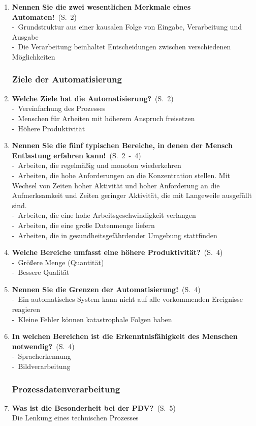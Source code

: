 \documentclass[a4paper,12pt]{article}
\newcommand{\question}[3]{\pagebreak[3]\item {\textbf{#1?}}\ (S.\ #2)#3}
\newcommand{\statement}[3]{\pagebreak[3]\item {\textbf{#1!}}\ (S.\ #2)#3}
\newcommand{\catchword}[1]{\\-\ #1}
\newcommand{\normaltext}[1]{\\#1}
\newcommand{\page}[1]{#1}
\newcommand{\pages}[2]{#1\ -\ #2}
\begin{document}
\begin{enumerate}
  \statement{Nennen Sie die zwei wesentlichen Merkmale eines Automaten}{\page{2}}
  {
    \catchword{Grundstruktur aus einer kausalen Folge von Eingabe, Verarbeitung und Ausgabe}
    \catchword{Die Verarbeitung beinhaltet Entscheidungen zwischen verschiedenen Möglichkeiten}
  }

  \subsubsection{Ziele der Automatisierung}

  \question{Welche Ziele hat die Automatisierung}{\page{2}}
  {
    \catchword{Vereinfachung des Prozesses}
    \catchword{Menschen für Arbeiten mit höherem Anspruch freisetzen}
    \catchword{Höhere Produktivität}
  }

  \statement{Nennen Sie die fünf typischen Bereiche,
             in denen der Mensch Entlastung erfahren kann}{\pages{2}{4}}
  {
    \catchword{Arbeiten, die regelmäßig und monoton wiederkehren}
    \catchword{Arbeiten, die hohe Anforderungen an die Konzentration stellen. Mit Wechsel von Zeiten
               hoher Aktivität und hoher Anforderung an die Aufmerksamkeit und Zeiten geringer Aktivität,
               die mit Langeweile ausgefüllt sind.}
    \catchword{Arbeiten, die eine hohe Arbeitsgeschwindigkeit verlangen}
    \catchword{Arbeiten, die eine große Datenmenge liefern}
    \catchword{Arbeiten, die in gesundheitsgefährdender Umgebung stattfinden}
  }

  \question{Welche Bereiche umfasst eine höhere Produktivität}{\page{4}}
  {
    \catchword{Größere Menge (Quantität)}
    \catchword{Bessere Qualität}
  }

  \statement{Nennen Sie die Grenzen der Automatisierung}{\page{4}}
  {
    \catchword{Ein automatisches System kann nicht auf alle vorkommenden Ereignisse reagieren}
    \catchword{Kleine Fehler können katastrophale Folgen haben}
  }

  \question{In welchen Bereichen ist die Erkenntnisfähigkeit des Menschen notwendig}{\page{4}}
  {
    \catchword{Spracherkennung}
    \catchword{Bildverarbeitung}
  }

  \subsubsection{Prozessdatenverarbeitung}

  \question{Was ist die Besonderheit bei der PDV}{\page{5}}
  {
    \normaltext{Die Lenkung eines technischen Prozesses}
  }


\end{enumerate}
\end{document}
